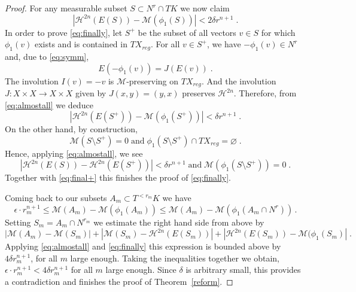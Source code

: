 \documentclass[12pt,leqno,intlimits]{amsart}
\numberwithin{equation}{section}
\theoremstyle{definition}
\theoremstyle{remark}
\newcommand{\tref}[1]{Theorem~\ref{#1}}
\def\:{\colon}
\def\emptyset{\varnothing}
\begin{document}
\begin{proof}
For any measurable subset $S\subset N^r \cap TK$  we now claim
\begin{equation} \label{eq:finally}
|\mathcal H^{2n} (E(S)) - \mathcal M (\phi _1 (S))|  <  2 \delta r^{n+1} \; .
\end{equation}
In order to prove \eqref{eq:finally}, let $S^+$ be the subset of all vectors $v\in S $ for which $\phi_1 (v)$ exists  and is contained in $TX_{reg}$.
For all $v\in S^+$, we have $-\phi _1 (v) \in N^r$ and,   due to \eqref{eq:symm},
$$E(-\phi_1 (v)) =J(E(v)) \;.$$
The involution  $I(v)=-v$ is $\mathcal M$-preserving on $TX_{reg}$.  And the involution
 $J\:X\times X\to X\times X$ given by $J(x,y)=(y,x)$ preserves $\mathcal H^{2n}$. Therefore, from \eqref{eq:almostall} we deduce
 \begin{equation} \label{eq:final+}
 |\mathcal H^{2n} (E(S^+)) - \mathcal M (\phi _1 (S^+))|  <   \delta r^{n+1} \;.
\end{equation}
On the other hand, by construction,
 $$ \mathcal M (S\setminus S^+ )=0 \; \text{and} \; \phi _1 (S\setminus S^+)\cap TX_{reg} =\emptyset \; .$$
  Hence, applying \eqref{eq:almostall}, we see
 $$|\mathcal H^{2n} (E(S))- \mathcal H^{2n} (E(S^+))|< \delta r^{n+1} \; \text{and} \; \mathcal M (\phi _1 (S\setminus S^+)) =0 \;.$$
 Together with \eqref{eq:final+}  this finishes the proof of \eqref{eq:finally}.


Coming back to our subsets $A_m\subset T^{<r_m} K$ we have
 $$\epsilon \cdot r_m^ {n+1} \leq \mathcal M ( A_m) - \mathcal M( \phi _1 (A_m)) \leq \mathcal M ( A_m) - \mathcal M( \phi _1 (A_m\cap N^r)) \,.$$
Setting  $S_m=A_m\cap N^{r_m}$ we estimate the right hand side from above by
$$|\mathcal M (A_m) -  \mathcal M(S_m)|
+|\mathcal M (S_m )  - \mathcal H^{2n} (E(S_m) )| + | \mathcal H ^{2n} (E(S_m)) - \mathcal M (\phi _1(S_m)|  \;.$$
Applying  \eqref{eq:almostall} and \eqref{eq:finally}  this expression is bounded above by $4 \delta r _m^{n+1}$, for all $m$ large enough. Taking the inequalities together we obtain,  $\epsilon \cdot r_m^ {n+1}< 4 \delta r _m^{n+1}$ for all $m$ large enough.
Since $\delta$ is arbitrary small, this provides a  contradiction  and  finishes the proof of \tref{reform}.
\end{proof}
\end{document}
